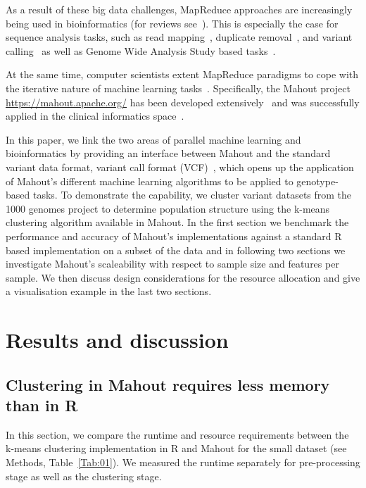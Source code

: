 \documentclass{bioinfo}
\begin{document}
As a result of these big data challenges, MapReduce approaches are increasingly being used in bioinformatics (for reviews see~\citep{Zou2013, Qiu2010,Taylor2010}). This is especially the case for sequence analysis tasks, such as read mapping~\citep{Schatz2009}, duplicate removal~\citep{Jourdren2012}, and variant calling~\citep{Langmead2009, McKenna2010} as well as Genome Wide Analysis Study based tasks~\citep{Huang2013, Guo2014}.

At the same time, computer scientists extent MapReduce paradigms to cope with the iterative nature of machine learning tasks~\citep{Chu2009}. Specifically, the Mahout project \url{https://mahout.apache.org/} has been developed extensively~\citep{Ranger2007, Owen2011} and was successfully applied in the clinical informatics space~\citep{Dong2013}.

In this paper, we link the two areas of parallel machine learning and bioinformatics by providing an interface between Mahout and the standard variant data format, variant call format (VCF)~\citep{1KG2012}, which opens up the application of Mahout's different machine learning algorithms to be applied to genotype-based tasks. 
To demonstrate the capability, we cluster variant datasets from the 1000 genomes project to determine population structure using the k-means clustering algorithm available in Mahout. In the first section we benchmark the performance and accuracy of Mahout's implementations against a standard R based implementation on a subset of the data and in following two sections we investigate Mahout's scaleability with respect to sample size and features per sample. We then discuss design considerations for the resource allocation and give a visualisation example in the last two sections.  

\section*{Results and discussion}

\subsection*{Clustering in Mahout requires less memory than in R}
In this section, we compare the runtime and resource requirements between the k-means clustering implementation in R and Mahout for the small \NinteenPhaseone{} dataset (see Methods, Table~\ref{Tab:01}). 
We measured the runtime separately for pre-processing stage as well as the clustering stage. 
\end{document}
